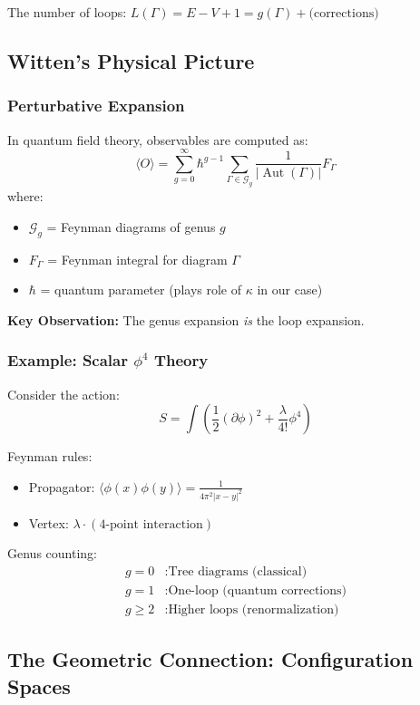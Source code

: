 The number of loops: $L(\Gamma) = E - V + 1 = g(\Gamma) + \text{(corrections)}$

\subsection{Witten's Physical Picture}

\subsubsection{Perturbative Expansion}

In quantum field theory, observables are computed as:
$$\langle O \rangle = \sum_{g=0}^{\infty} \hbar^{g-1} \sum_{\Gamma \in \mathcal{G}_g} 
\frac{1}{|\operatorname{Aut}(\Gamma)|} F_{\Gamma}$$
where:
\begin{itemize}
\item $\mathcal{G}_g$ = Feynman diagrams of genus $g$
\item $F_{\Gamma}$ = Feynman integral for diagram $\Gamma$
\item $\hbar$ = quantum parameter (plays role of $\kappa$ in our case)
\end{itemize}

\textbf{Key Observation:} The genus expansion \emph{is} the loop expansion.

\subsubsection{Example: Scalar $\phi^4$ Theory}

Consider the action:
$$S = \int \left( \frac{1}{2}(\partial \phi)^2 + \frac{\lambda}{4!} \phi^4 \right)$$

Feynman rules:
\begin{itemize}
\item Propagator: $\langle \phi(x) \phi(y) \rangle = \frac{1}{4\pi^2 |x-y|^2}$
\item Vertex: $\lambda \cdot (\text{4-point interaction})$
\end{itemize}

Genus counting:
\begin{align}
g=0 &: \text{Tree diagrams (classical)} \\
g=1 &: \text{One-loop (quantum corrections)} \\
g \geq 2 &: \text{Higher loops (renormalization)}
\end{align}

\subsection{The Geometric Connection: Configuration Spaces}

